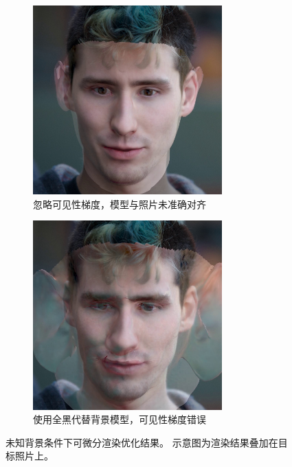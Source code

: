 \begin{figure}[p]
\centering
\begin{subfigure}[t]{0.5\textwidth}
    \centering
    \includegraphics[width=0.8\textwidth]{figures/black-bg_no-aa}
    \caption{忽略可见性梯度，模型与照片未准确对齐}
    \label{fig:problem_a}
\end{subfigure}%
\begin{subfigure}[t]{0.5\textwidth}
    \centering
    \includegraphics[width=0.8\textwidth]{figures/black-bg}
    \caption{使用全黑代替背景模型，可见性梯度错误}
    \label{fig:problem_b}
\end{subfigure}%
\caption[未知背景条件下可微分渲染优化结果]{
    未知背景条件下可微分渲染优化结果。
    示意图为渲染结果叠加在目标照片上。
}
\end{figure}

